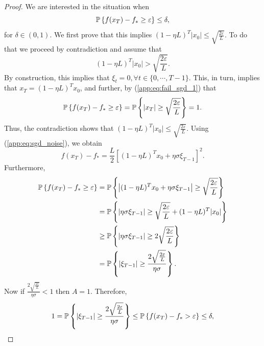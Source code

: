 \documentclass{article} %
\numberwithin{equation}{section}
\renewcommand{\eqref}[1]{(\ref{#1})}
\begin{document}
\begin{proof}
    We are interested in the situation when  
    \begin{equation}
        \mathbb{P} \left\{f(x_T)-f_* \geq \varepsilon\right\} \leq \delta,
    \end{equation}
    for $\delta \in (0,1)$. 
    We first prove that this implies $(1 - \eta L)^T |x_0| \leq \sqrt{\frac{2\varepsilon}{L}}$. 
    To do that we proceed by contradiction and assume that 
    \begin{equation}\label{app:eq:fail_sgd_1}
        (1 - \eta L)^T |x_0| > \sqrt{\frac{2\varepsilon}{L}}.
    \end{equation}
    By construction, this implies that  $\xi_t = 0, \forall t \in \{0,\cdots, T-1\}$. 
    This, in turn, implies that $x_T = (1-\eta L)^T x_0$, and further, by \eqref{app:eq:fail_sgd_1} that
    \begin{align*}
        \mathbb{P} \left\{f(x_T)-f_* \geq \varepsilon\right\} = \mathbb{P}\left\{|x_T| \geq \sqrt{\frac{2\varepsilon}{L}}\right\} = 1.
    \end{align*}
    Thus, the contradiction shows that $(1 - \eta L)^T |x_0| \leq \sqrt{\frac{2\varepsilon}{L}}$.
    Using \eqref{app:eq:sgd_noise}, we obtain
    \begin{equation}
        f(x_T)-f_* = \frac{L}{2} \left[(1 - \eta L)^T x_0 + \eta \sigma \xi_{T-1}\right]^2.
    \end{equation}
    Furthermore,
    \begin{equation}
        \begin{aligned}
            \mathbb{P}\left\{f(x_T)-f_* \geq \varepsilon\right\} 
            &= \mathbb{P}\left\{\left|(1 - \eta L)^T  x_0 + \eta \sigma \xi_{T-1} \right| \geq \sqrt{\frac{2\varepsilon}{L}}\right\} \\
            &= \mathbb{P}\left\{\left|\eta \sigma \xi_{T-1}\right| \geq \sqrt{\frac{2\varepsilon}{L}} + (1 - \eta L)^T  |x_0| \right\} \\
            &\geq \mathbb{P}\left\{\left|\eta \sigma \xi_{T-1}\right| \geq 2\sqrt{\frac{2\varepsilon}{L}}\right\} \\
            &= \mathbb{P}\left\{\left|\xi_{T-1}\right| \geq \frac{2\sqrt{\frac{2\varepsilon}{L}}}{\eta \sigma} \right\}.
        \end{aligned}
    \end{equation}
    Now if $\frac{2\sqrt{\frac{2\varepsilon}{L}}}{\eta \sigma} < 1$ then $A = 1$. Therefore, 
    \begin{equation}
        1 = \prob\left\{\left|\xi_{T-1}\right| \geq \frac{2\sqrt{\frac{2\varepsilon}{L}}}{\eta \sigma} \right\} \leq \prob\left\{f(x_T)-f_* > \varepsilon\right\} \leq \delta, 

\end{equation}
\end{proof}
\end{document}
